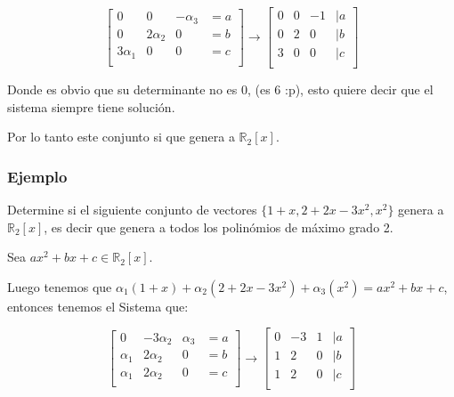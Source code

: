 \documentclass[12pt]{report}                                %
\begin{document}
            \begin{equation*}
                \begin{bmatrix}
                    0 & 0 & -\alpha_3 & = a\\
                    0 & 2\alpha_2 & 0 & = b\\
                    3\alpha_1 & 0 & 0 & = c\\
                \end{bmatrix}
                \to
                \begin{bmatrix}
                    0 & 0 & -1 & | a\\
                    0 & 2 & 0 &  | b\\
                    3 & 0 & 0 &  | c\\
                \end{bmatrix}
            \end{equation*}

            Donde es obvio que su determinante no es 0, (es 6 :p), esto quiere decir que el
            sistema siempre tiene solución.

            Por lo tanto este conjunto si que genera a $\mathbb{R}_2 [x]$.

            \subsubsection{Ejemplo}
            Determine si el siguiente conjunto de vectores $\{ 1+x,2+2x-3x^2,x^2\}$ genera
            a $\mathbb{R}_2 [x]$, es decir que genera a todos los
            polinómios de máximo grado 2.

            Sea $ax^2 + bx +c \in \mathbb{R}_2 [x]$.

            Luego tenemos que
            $\alpha_1 (1+x) + \alpha_2 (2+2x-3x^2) + \alpha_3 (x^2) = ax^2 + bx +c$,
            entonces tenemos el Sistema que:
            
            \begin{equation*}
                \begin{bmatrix}
                    0 & -3\alpha_2 & \alpha_3 & = a\\
                    \alpha_1 & 2\alpha_2 & 0 & = b\\
                    \alpha_1 & 2\alpha_2 & 0 & = c\\
                \end{bmatrix}
                \to
                \begin{bmatrix}
                    0 & -3 & 1 & | a\\
                    1 & 2 & 0 &  | b\\
                    1 & 2 & 0 &  | c\\
                \end{bmatrix}
            \end{equation*}
\end{document}
